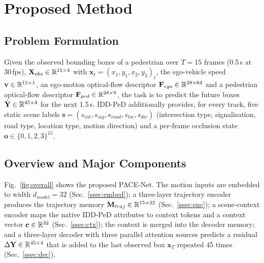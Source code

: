 \section{Proposed Method}\label{sec:method}
\subsection{Problem Formulation}
Given the observed bounding boxes of a pedestrian over $T{=}15$ frames (0.5\,s at 30\,fps), $\mathbf{X}_{obs}\in\mathbb{R}^{15\times4}$ with $\mathbf{x}_t=(x_1,y_1,x_2,y_2)_t$, the ego-vehicle speed $\mathbf{v}\in\mathbb{R}^{15\times1}$, an ego-motion optical-flow descriptor $\mathbf{F}_{ego}\in\mathbb{R}^{28\times64}$ and a pedestrian optical-flow descriptor $\mathbf{F}_{ped}\in\mathbb{R}^{28\times9}$, the task is to predict the future boxes $\hat{\mathbf{Y}}\in\mathbb{R}^{45\times4}$ for the next 1.5\,s. IDD-PeD additionally provides, for every track, five static scene labels $\mathbf{s}=(s_{int},s_{sig},s_{road},s_{loc},s_{dir})$ (intersection type, signalisation, road type, location type, motion direction) and a per-frame occlusion state $\mathbf{o}\in\{0,1,2,3\}^{15}$.

\subsection{Overview and Major Components}
Fig.~\ref{fig:overall} shows the proposed PACE-Net. The motion inputs are embedded to width $d_{model}{=}32$ (Sec.~\ref{ssec:embed}); a three-layer trajectory encoder produces the trajectory memory $\mathbf{M}_{traj}\in\mathbb{R}^{15\times32}$ (Sec.~\ref{ssec:enc}); a scene-context encoder maps the native IDD-PeD attributes to context tokens and a context vector $\mathbf{c}\in\mathbb{R}^{32}$ (Sec.~\ref{ssec:ctx}); the context is merged into the decoder memory; and a three-layer decoder with three parallel attention sources predicts a residual $\Delta\mathbf{Y}\in\mathbb{R}^{45\times4}$ that is added to the last observed box $\mathbf{x}_T$ repeated 45 times (Sec.~\ref{ssec:dec}).

